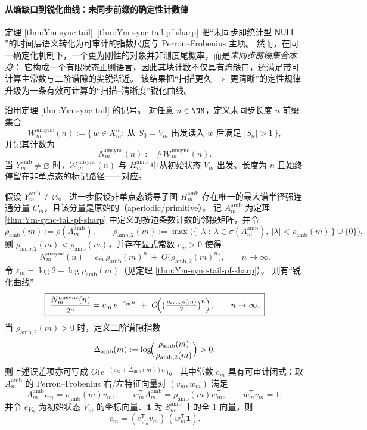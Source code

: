 \paragraph{从熵缺口到锐化曲线：未同步前缀的确定性计数律}
定理 \ref{thm:Ym-sync-tail}--\ref{thm:Ym-sync-tail-pf-sharp} 把“未同步即统计型 \(\mathsf{NULL}\)”的时间层语义转化为可审计的指数尺度与 Perron--Frobenius 主项。
然而，在同一确定化机制下，一个更为刚性的对象并非测度尾概率，而是\emph{未同步前缀集合本身}：
它构成一个有限状态正则语言，因此其块计数不仅具有熵缺口，还满足带可计算主常数与二阶谱隙的尖锐渐近。
该结果把“扫描更久 \(\Rightarrow\) 更清晰”的定性规律升级为一条有效可计算的“扫描--清晰度”锐化曲线。

\begin{definition}[未同步前缀集合与计数]\label{def:Ym-unsync-prefix-count}
沿用定理 \ref{thm:Ym-sync-tail} 的记号。
对任意 \(n\in\NN\)，定义未同步长度-\(n\) 前缀集合
\[
\mathcal{W}_{m}^{\mathrm{unsync}}(n)
:=\{\,w\in X_m^n:\ \text{从 }S_0=V_m\text{ 出发读入 }w\text{ 后满足 }|S_n|>1\,\},
\]
并记其计数为
\[
N_m^{\mathrm{unsync}}(n):=\#\mathcal{W}_{m}^{\mathrm{unsync}}(n).
\]
当 \(Y_m^{\mathrm{amb}}\neq\varnothing\) 时，\(\mathcal{W}_{m}^{\mathrm{unsync}}(n)\) 与 \(H_m^{\mathrm{amb}}\) 中从初始状态 \(V_m\) 出发、长度为 \(n\) 且始终停留在非单点态的标记路径一一对应。
\end{definition}

\begin{theorem}\label{thm:Ym-unsync-prefix-pf-sharp}
假设 \(Y_m^{\mathrm{amb}}\neq\varnothing\)。
进一步假设非单点态诱导子图 \(H_m^{\mathrm{amb}}\) 存在唯一的最大谱半径强连通分量 \(C_m\)，且该分量是原始的（aperiodic/primitive）。
记 \(A_m^{\mathrm{amb}}\) 为定理 \ref{thm:Ym-sync-tail-pf-sharp} 中定义的按边条数计数的邻接矩阵，并令
\[
\rho_{\mathrm{amb}}(m):=\rho(A_m^{\mathrm{amb}}),\qquad
\rho_{\mathrm{amb},2}(m):=\max\bigl(\{\,|\lambda|:\ \lambda\in\sigma(A_m^{\mathrm{amb}}),\ |\lambda|<\rho_{\mathrm{amb}}(m)\,\}\cup\{0\}\bigr),
\]
则 \(\rho_{\mathrm{amb},2}(m)<\rho_{\mathrm{amb}}(m)\)，并存在显式常数 \(c_m>0\) 使得
\[
\boxed{\;
N_m^{\mathrm{unsync}}(n)
=c_m\,\rho_{\mathrm{amb}}(m)^{n}\ +\ O\!\bigl(\rho_{\mathrm{amb},2}(m)^{n}\bigr),
\qquad n\to\infty.\;}
\]
令 \(\varepsilon_m=\log 2-\log\rho_{\mathrm{amb}}(m)\)（见定理 \ref{thm:Ym-sync-tail-pf-sharp}）。
则有“锐化曲线”
\[
\boxed{\;
\frac{N_m^{\mathrm{unsync}}(n)}{2^n}
=c_m\,e^{-\varepsilon_m n}\ +\ O\!\Bigl(\bigl(\tfrac{\rho_{\mathrm{amb},2}(m)}{2}\bigr)^{n}\Bigr),
\qquad n\to\infty.\;}
\]
当 \(\rho_{\mathrm{amb},2}(m)>0\) 时，定义二阶谱隙指数
\[
\Delta_{\mathrm{amb}}(m):=\log\!\Bigl(\frac{\rho_{\mathrm{amb}}(m)}{\rho_{\mathrm{amb},2}(m)}\Bigr)>0,
\]
则上述误差项亦可写成 \(O\!\bigl(e^{-(\varepsilon_m+\Delta_{\mathrm{amb}}(m))n}\bigr)\)。
其中常数 \(c_m\) 具有可审计闭式：取 \(A_m^{\mathrm{amb}}\) 的 Perron--Frobenius 右/左特征向量对 \((v_m,w_m)\) 满足
\[
A_m^{\mathrm{amb}}v_m=\rho_{\mathrm{amb}}(m)v_m,\qquad
w_m^{\mathsf T}A_m^{\mathrm{amb}}=\rho_{\mathrm{amb}}(m)w_m^{\mathsf T},\qquad
w_m^{\mathsf T}v_m=1,
\]
并令 \(e_{V_m}\) 为初始状态 \(V_m\) 的坐标向量、\(\mathbf 1\) 为 \(\mathcal{S}_m^{\mathrm{amb}}\) 上的全 \(1\) 向量，则
\[
\boxed{\;
c_m=(e_{V_m}^{\mathsf T}v_m)\,(w_m^{\mathsf T}\mathbf 1).\;}
\]
\end{theorem}

